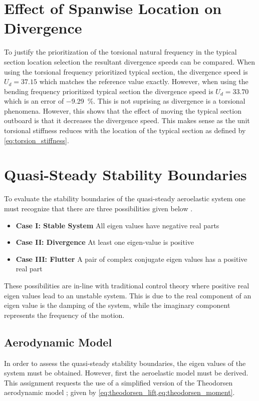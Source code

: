 \section{Effect of Spanwise Location on Divergence}
To justify the prioritization of the torsional natural frequency in the typical
section location selection the resultant divergence speeds can be compared.
When using the torsional frequency prioritized typical section, the divergence
speed is $U_d = 37.15$ which matches the reference value exactly. However, when
using the bending frequency prioritized typical section the divergence speed is
$U_d = 33.70$ which is an error of \SI{-9.29}{\percent}. This is not suprising
as divergence is a torsional phenomena. However, this shows that the effect of
moving the typical section outboard is that it decreases the divergence speed.
This makes sense as the unit torsional stiffness reduces with the location of
the typical section as defined by \cref{eq:torsion_stiffness}.

\section{Quasi-Steady Stability Boundaries}
\label{sec:conditions}
To evaluate the stability boundaries of the quasi-steady aeroelastic system one
must recognize that there are three possibilities given below
\autocite[s.11]{andrianneLectureDynamicAeroelasticity}.

\begin{itemize}
    \item \textbf{Case I: Stable System} All eigen values have negative real
    parts
    \item \textbf{Case II: Divergence} At least one eigen-value is positive
    \item \textbf{Case III: Flutter} A pair of complex conjugate
    eigen values has a positive real part
\end{itemize}

These possibilities are in-line with traditional control theory where positive
real eigen values lead to an unstable system. This is due to the real component
of an eigen value is the damping of the system, while the imaginary component
represents the frequency of the motion.

\subsection{Aerodynamic Model}
In order to assess the quasi-steady stability boundaries, the eigen values of
the system must be obtained. However, first the aeroelastic model must be
derived. This assignment requests the use of a simplified version of the
Theodorsen aerodynamic model \autocite{Theodorsen1935}; given by
\cref{eq:theodorsen_lift,eq:theodorsen_moment}.

